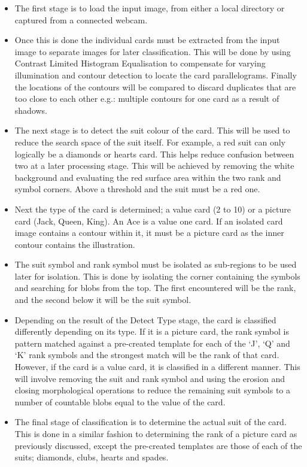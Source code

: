 \documentclass[a4paper,12pt,notitlepage]{article}
\begin{document}
		\begin{itemize}
			\item The first stage is to load the input image, from either a local directory or captured from a connected webcam. 
			\item Once this is done the individual cards must be extracted from the input image to separate images for later classification. This will be done by using Contrast Limited Histogram Equalisation to compensate for varying illumination and contour detection to locate the card parallelograms. Finally the locations of the contours will be compared to discard duplicates that are too close to each other e.g.: multiple contours for one card as a result of shadows.
			\item The next stage is to detect the suit colour of the card. This will be used to reduce the search space of the suit itself. For example, a red suit can only logically be a diamonds or hearts card. This helps reduce confusion between two at a later processing stage. This will be achieved by removing the white background and evaluating the red surface area within the two rank and symbol corners. Above a threshold and the suit must be a red one.
			\item Next the type of the card is determined; a value card (2 to 10) or a picture card (Jack, Queen, King). An Ace is a value one card. If an isolated card image contains a contour within it, it must be a picture card as the inner contour contains the illustration. 
			\item The suit symbol and rank symbol must be isolated as sub-regions to be used later for isolation. This is done by isolating the corner containing the symbols and searching for blobs from the top. The first encountered will be the rank, and the second below it will be the suit symbol.
			\item Depending on the result of the Detect Type stage, the card is classified differently depending on its type.  If it is a picture card, the rank symbol is pattern matched against a pre-created template for each of the `J', `Q' and `K' rank symbols and the strongest match will be the rank of that card. However, if the card is a value card, it is classified in a different manner. This will involve removing the suit and rank symbol and using the erosion and closing morphological operations to reduce the remaining suit symbols to a number of countable blobs equal to the value of the card. 
			\item The final stage of classification is to determine the actual suit of the card. This is done in a similar fashion to determining the rank of a picture card as previously discussed, except the pre-created templates are those of each of the suits; diamonds, clubs, hearts and spades.
		\end{itemize}
\end{document}

